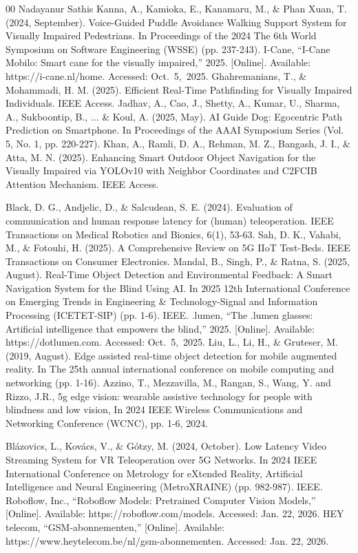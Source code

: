 \documentclass{ieeeaccess}
\begin{document}
\begin{thebibliography}{00}
Nadayanur Sathis Kanna, A., Kamioka, E., Kanamaru, M., \& Phan Xuan, T. (2024, September). Voice-Guided Puddle Avoidance Walking Support System for Visually Impaired Pedestrians. In Proceedings of the 2024 The 6th World Symposium on Software Engineering (WSSE) (pp. 237-243).
I-Cane,
``I-Cane Mobilo: Smart cane for the visually impaired,'' 2025. [Online]. Available: https://i-cane.nl/home. Accessed: Oct.~5,~2025.
Ghahremanians, T., \& Mohammadi, H. M. (2025). Efficient Real-Time Pathfinding for Visually Impaired Individuals. IEEE Access.
Jadhav, A., Cao, J., Shetty, A., Kumar, U., Sharma, A., Sukboontip, B., ... \& Koul, A. (2025, May). AI Guide Dog: Egocentric Path Prediction on Smartphone. In Proceedings of the AAAI Symposium Series (Vol. 5, No. 1, pp. 220-227).
Khan, A., Ramli, D. A., Rehman, M. Z., Bangash, J. I., \& Atta, M. N. (2025). Enhancing Smart Outdoor Object Navigation for the Visually Impaired via YOLOv10 with Neighbor Coordinates and C2FCIB Attention Mechanism. IEEE Access.

Black, D. G., Andjelic, D., \& Salcudean, S. E. (2024). Evaluation of communication and human response latency for (human) teleoperation. IEEE Transactions on Medical Robotics and Bionics, 6(1), 53-63.
Sah, D. K., Vahabi, M., \& Fotouhi, H. (2025). A Comprehensive Review on 5G IIoT Test-Beds. IEEE Transactions on Consumer Electronics.
Mandal, B., Singh, P., \& Ratna, S. (2025, August). Real-Time Object Detection and Environmental Feedback: A Smart Navigation System for the Blind Using AI. In 2025 12th International Conference on Emerging Trends in Engineering \& Technology-Signal and Information Processing (ICETET-SIP) (pp. 1-6). IEEE.
.lumen,
``The .lumen glasses: Artificial intelligence that empowers the blind,'' 2025. [Online]. Available: https://dotlumen.com. Accessed: Oct.~5,~2025.
Liu, L., Li, H., \& Gruteser, M. (2019, August). Edge assisted real-time object detection for mobile augmented reality. In The 25th annual international conference on mobile computing and networking (pp. 1-16).
Azzino, T., Mezzavilla, M., Rangan, S., Wang, Y. and Rizzo, J.R., 5g edge vision: wearable assistive technology for people with blindness and low vision, In 2024 IEEE Wireless Communications and Networking Conference (WCNC), pp. 1-6, 2024.

Blázovics, L., Kovács, V., \& Gótzy, M. (2024, October). Low Latency Video Streaming System for VR Teleoperation over 5G Networks. In 2024 IEEE International Conference on Metrology for eXtended Reality, Artificial Intelligence and Neural Engineering (MetroXRAINE) (pp. 982-987). IEEE.
Roboflow, Inc., ``Roboflow Models: Pretrained Computer Vision Models,'' [Online].
Available: https://roboflow.com/models. Accessed: Jan. 22, 2026.
HEY telecom, ``GSM-abonnementen,'' [Online].
Available: https://www.heytelecom.be/nl/gsm-abonnementen. Accessed: Jan. 22, 2026.
\end{thebibliography}
\end{document}
